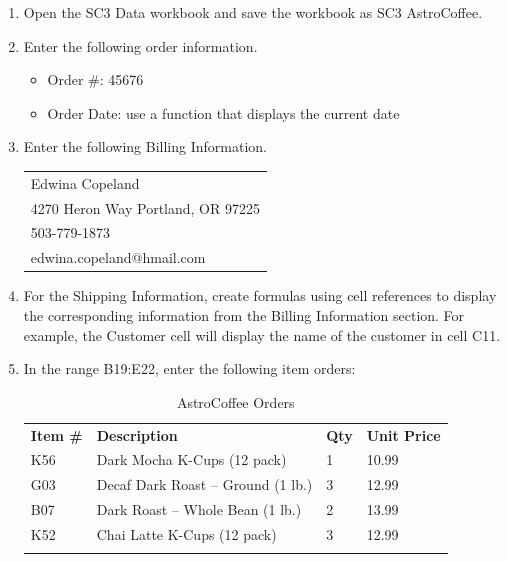 \begin{enumerate}
	\item Open the SC3 Data workbook and save the workbook as SC3 AstroCoffee.
\item Enter the following order information.
\begin{itemize}
	\item Order \#: 45676
	\item Order Date: use a function that displays the current date
\end{itemize}

\item Enter the following Billing Information.

\begin{table}[H]
	\centering
	\begin{tabulary}{\linewidth}{L}
		\hline
		Edwina Copeland\\
		4270 Heron Way Portland, OR 97225\\
		503-779-1873\\
		edwina.copeland@hmail.com\\
		\hline
	\end{tabulary} 
\end{table}

\item For the Shipping Information, create formulas using cell references to display the corresponding information from the Billing Information section. For example, the Customer cell will display the name of the customer in cell \textsf{C11}.
\item In the range \textsf{B19:E22}, enter the following item orders:

{\small
	\begin{longtable}{p{0.4in}p{2.10in}p{0.25in}p{0.5in}} %
		\textbf{Item \#} & \textbf{Description} & \textbf{Qty} & \textbf{Unit Price}\endhead
		\hline \\
		K56 & Dark Mocha K-Cups (12 pack) & 1 & 10.99\\
		G03 & Decaf Dark Roast – Ground (1 lb.) & 3 & 12.99\\
		B07 & Dark Roast – Whole Bean (1 lb.) & 2 & 13.99\\
		K52 & Chai Latte K-Cups (12 pack) & 3 & 12.99\\
		\caption{AstroCoffee Orders}
		\label{03:tab02}
	\end{longtable}
}


\end{enumerate}
